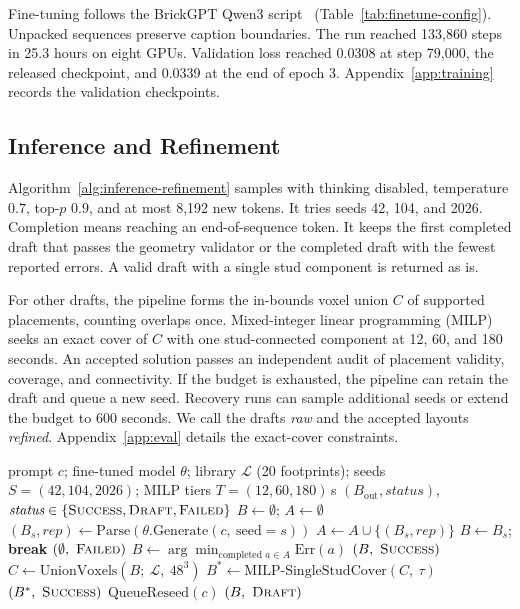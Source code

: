 \documentclass[letterpaper]{article} %
\begin{document}
Fine-tuning follows the BrickGPT Qwen3 script~\cite{brickgpt} (Table~\ref{tab:finetune-config}). Unpacked sequences preserve caption boundaries. The run reached 133,860 steps in 25.3 hours on eight GPUs. Validation loss reached 0.0308 at step 79,000, the released checkpoint, and 0.0339 at the end of epoch 3. Appendix~\ref{app:training} records the validation checkpoints.


\subsection{Inference and Refinement}
Algorithm~\ref{alg:inference-refinement} samples with thinking disabled, temperature $0.7$, top-$p$ $0.9$, and at most 8,192 new tokens. It tries seeds 42, 104, and 2026. Completion means reaching an end-of-sequence token. It keeps the first completed draft that passes the geometry validator or the completed draft with the fewest reported errors. A valid draft with a single stud component is returned as is.

For other drafts, the pipeline forms the in-bounds voxel union $C$ of supported placements, counting overlaps once. Mixed-integer linear programming (MILP) seeks an exact cover of $C$ with one stud-connected component at 12, 60, and 180 seconds. An accepted solution passes an independent audit of placement validity, coverage, and connectivity. If the budget is exhausted, the pipeline can retain the draft and queue a new seed. Recovery runs can sample additional seeds or extend the budget to 600 seconds. We call the drafts \emph{raw} and the accepted layouts \emph{refined}. Appendix~\ref{app:eval} details the exact-cover constraints.
\begin{algorithm}[tb]
\caption{BrickForma inference and refinement}
\label{alg:inference-refinement}
\small
\begin{algorithmic}[1]
\REQUIRE prompt $c$; fine-tuned model $\theta$; library $\mathcal{L}$ (20 footprints); seeds $S=(42,104,2026)$; MILP tiers $T=(12,60,180)$\,s
\ENSURE $(B_{\mathrm{out}}, \textit{status})$, $\textit{status}\in\{\textsc{Success},\textsc{Draft},\textsc{Failed}\}$
\STATE $B \gets \emptyset$; $A \gets \emptyset$
  \STATE $(B_s,\textit{rep}) \gets \mathrm{Parse}(\theta.\mathrm{Generate}(c,\ \mathrm{seed}{=}s))$
  \STATE $A \gets A \cup \{(B_s,\textit{rep})\}$
    \STATE $B \gets B_s$; \textbf{break}
  \ENDIF
\ENDFOR
{}
    \RETURN $(\emptyset,\ \textsc{Failed})$
  \ENDIF
  \STATE $B \gets \arg\min_{\text{completed } a\in A} \mathrm{Err}(a)$
\ENDIF
{}
  \RETURN $(B,\ \textsc{Success})$ 
\ENDIF
\STATE $C \gets \mathrm{UnionVoxels}(B;\ \mathcal{L},\ 48^3)$ 
  \STATE $B^{*} \gets \mathrm{MILP\text{-}SingleStudCover}(C,\ \tau)$
    \RETURN $(B^{*},\ \textsc{Success})$
  \ENDIF
\ENDFOR
\STATE $\mathrm{QueueReseed}(c)$
\RETURN $(B,\ \textsc{Draft})$ 
\end{algorithmic}
\end{algorithm}
\end{document}

